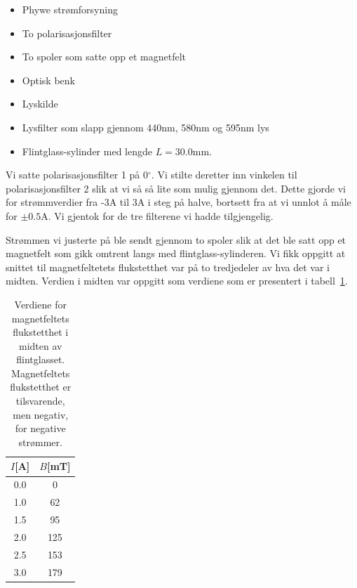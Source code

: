 \documentclass[a4paper,11pt, twocolumn]{article}
\begin{document}
\begin{itemize}
	\item Phywe strømforsyning
	\item To polarisasjonsfilter
	\item To spoler som satte opp et magnetfelt 	
	\item Optisk benk
	\item Lyskilde
	\item Lysfilter som slapp gjennom 440nm, 580nm og 595nm lys
	\item Flintglass-sylinder med lengde $L = 30.0$mm.
\end{itemize}
Vi satte polarisasjonsfilter 1 på 0$^\circ$. Vi stilte deretter inn vinkelen til polarisasjonsfilter 2 slik at vi så så lite som mulig gjennom det. Dette gjorde vi for strømmverdier fra -3A til 3A i steg på halve, bortsett fra at vi unnlot å måle for $\pm0.5$A. Vi gjentok for de tre filterene vi hadde tilgjengelig.

Strømmen vi justerte på ble sendt gjennom to spoler slik at det ble satt opp et magnetfelt som gikk omtrent langs med flintglass-sylinderen. Vi fikk oppgitt at snittet til magnetfeltetets flukstetthet var på to tredjedeler av hva det var i midten. Verdien i midten var oppgitt som verdiene som er presentert i tabell~\ref{tab:fluksstyrke}.

\begin{table}
	\centering
	\caption{Verdiene for magnetfeltets flukstetthet i midten av flintglasset. Magnetfeltets flukstetthet er tilsvarende, men negativ, for negative strømmer.}
	\begin{tabular}{cc}
		\toprule
		\toprule
		$I$[A] & $B$[mT] \\
		\toprule
		0.0 & 0\\
		1.0 & 62\\
		1.5 & 95\\
		2.0 & 125\\
		2.5 & 153\\
		3.0 & 179\\
		\toprule
	\end{tabular}
	\label{tab:fluksstyrke}
\end{table}
\end{document}
